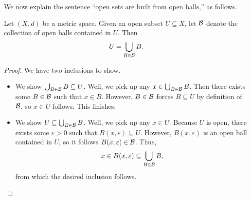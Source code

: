\documentclass[../main.tex]{subfiles}
\begin{document}
We now explain the sentence ``open sets are built from open balls,'' as follows.
\begin{proposition} \label{prop:open-ball-base}
    Let $(X,d)$ be a metric space. Given an open subset $U\subseteq X$, let $\mathcal{B}$ denote the collection of open balls contained in $U$. Then
    \[U=\bigcup_{B\in\mathcal{B}}B.\]
\end{proposition}
\begin{proof}
    We have two inclusions to show.
    \begin{itemize}
        \item We show $\bigcup_{B\in\mathcal{B}}B\subseteq U$. Well, we pick up any $x\in\bigcup_{B\in\mathcal{B}}B$. Then there exists some $B\in\mathcal{B}$ such that $x\in B$. However, $B\in\mathcal{B}$ forces $B\subseteq U$ by definition of $\mathcal{B}$, so $x\in U$ follows. This finishes.
        \item We show $U\subseteq\bigcup_{B\in\mathcal{B}}B$. Well, we pick up any $x\in U$. Because $U$ is open, there exists some $\varepsilon>0$ such that $B(x,\varepsilon)\subseteq U$. However, $B(x,\varepsilon)$ is an open ball contained in $U$, so it follows $B(x,\varepsilon)\in\mathcal{B}$. Thus,
        \[x\in B(x,\varepsilon)\subseteq\bigcup_{B\in\mathcal{B}}B,\]
        from which the desired inclusion follows.
        \qedhere
    \end{itemize}
\end{proof}

\end{document}
